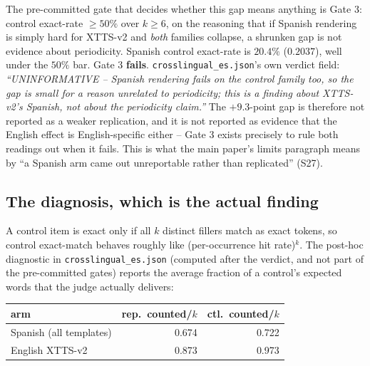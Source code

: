 \documentclass[11pt]{article}
\begin{document}
\noindent The pre-committed gate that decides whether this gap means anything
is Gate 3: control exact-rate $\ge 50\%$ over $k\ge6$, on the reasoning that if
Spanish rendering is simply hard for XTTS-v2 and \emph{both} families
collapse, a shrunken gap is not evidence about periodicity. Spanish control
exact-rate is $20.4\%$ ($0.2037$), well under the $50\%$ bar. Gate 3
\textbf{fails}. \texttt{crosslingual\_es.json}'s own verdict field: \emph{
``UNINFORMATIVE -- Spanish rendering fails on the control family too, so the
gap is small for a reason unrelated to periodicity; this is a finding about
XTTS-v2's Spanish, not about the periodicity claim.''} The $+9.3$-point gap is
therefore not reported as a weaker replication, and it is not reported as
evidence that the English effect is English-specific either -- Gate 3 exists
precisely to rule both readings out when it fails. This is what the main
paper's limits paragraph means by ``a Spanish arm came out unreportable rather
than replicated'' (S27).

\subsection{The diagnosis, which is the actual finding}

A control item is exact only if all $k$ distinct fillers match as exact
tokens, so control exact-match behaves roughly like (per-occurrence hit
rate)$^k$. The post-hoc diagnostic in \texttt{crosslingual\_es.json} (computed
after the verdict, and not part of the pre-committed gates) reports the
average fraction of a control's expected words that the judge actually
delivers:

\begin{center}
\begin{tabular}{@{}lrr@{}}
\toprule
arm & rep.\ counted/$k$ & ctl.\ counted/$k$ \\
\midrule
Spanish (all templates) & 0.674 & 0.722 \\
English XTTS-v2          & 0.873 & 0.973 \\
\bottomrule
\end{tabular}
\end{center}
\end{document}

